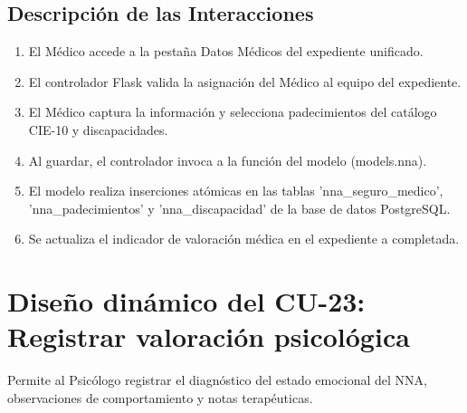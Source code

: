 \subsection{Descripción de las Interacciones}
\begin{enumerate}
    \item El Médico accede a la pestaña Datos Médicos del expediente unificado.
    \item El controlador Flask valida la asignación del Médico al equipo del expediente.
    \item El Médico captura la información y selecciona padecimientos del catálogo CIE-10 y discapacidades.
    \item Al guardar, el controlador invoca a la función del modelo (models.nna).
    \item El modelo realiza inserciones atómicas en las tablas 'nna\_seguro\_medico', 'nna\_padecimientos' y 'nna\_discapacidad' de la base de datos PostgreSQL.
    \item Se actualiza el indicador de valoración médica en el expediente a completada.
\end{enumerate}

\cleardoublepage
\section{Diseño dinámico del CU-23: Registrar valoración psicológica}
\label{sec:disenoDinamicoCU23}

Permite al Psicólogo registrar el diagnóstico del estado emocional del NNA, observaciones de comportamiento y notas terapéuticas.

